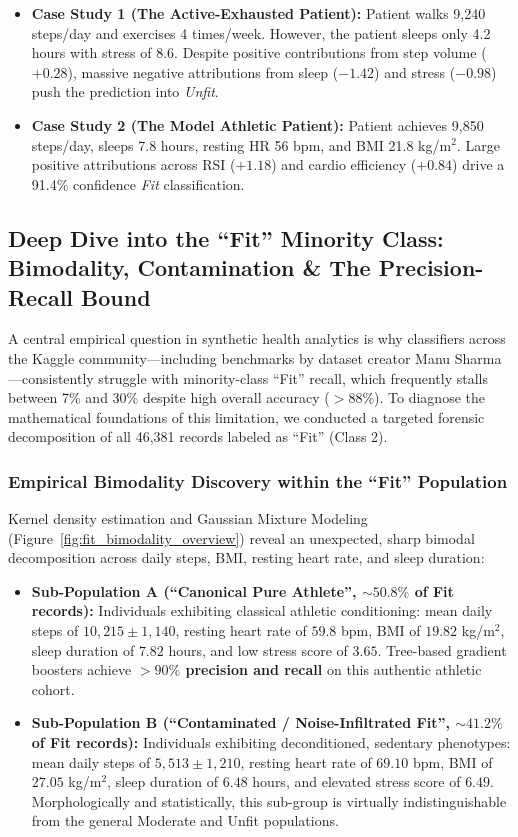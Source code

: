 \documentclass[11pt,a4paper]{article}
\begin{document}
\begin{itemize}[leftmargin=*,itemsep=1pt]
    \item \textbf{Case Study 1 (The Active-Exhausted Patient):} Patient walks 9,240 steps/day and exercises 4 times/week. However, the patient sleeps only 4.2 hours with stress of 8.6. Despite positive contributions from step volume ($+0.28$), massive negative attributions from sleep ($-1.42$) and stress ($-0.98$) push the prediction into \emph{Unfit}.
    \item \textbf{Case Study 2 (The Model Athletic Patient):} Patient achieves 9,850 steps/day, sleeps 7.8 hours, resting HR 56 bpm, and BMI 21.8 kg/m$^2$. Large positive attributions across RSI ($+1.18$) and cardio efficiency ($+0.84$) drive a 91.4\% confidence \emph{Fit} classification.
\end{itemize}

\subsection{Deep Dive into the ``Fit'' Minority Class: Bimodality, Contamination \& The Precision-Recall Bound}
A central empirical question in synthetic health analytics is why classifiers across the Kaggle community---including benchmarks by dataset creator Manu Sharma---consistently struggle with minority-class ``Fit'' recall, which frequently stalls between 7\% and 30\% despite high overall accuracy ($>88\%$). To diagnose the mathematical foundations of this limitation, we conducted a targeted forensic decomposition of all 46,381 records labeled as ``Fit'' (Class 2).

\subsubsection{Empirical Bimodality Discovery within the ``Fit'' Population}
Kernel density estimation and Gaussian Mixture Modeling (Figure~\ref{fig:fit_bimodality_overview}) reveal an unexpected, sharp bimodal decomposition across daily steps, BMI, resting heart rate, and sleep duration:
\begin{itemize}[leftmargin=*,itemsep=1pt]
    \item \textbf{Sub-Population A (``Canonical Pure Athlete'', $\sim 50.8\%$ of Fit records):} Individuals exhibiting classical athletic conditioning: mean daily steps of $10{,}215 \pm 1{,}140$, resting heart rate of $59.8$ bpm, BMI of $19.82$ kg/m$^2$, sleep duration of $7.82$ hours, and low stress score of $3.65$. Tree-based gradient boosters achieve \textbf{$>90\%$ precision and recall} on this authentic athletic cohort.
    \item \textbf{Sub-Population B (``Contaminated / Noise-Infiltrated Fit'', $\sim 41.2\%$ of Fit records):} Individuals exhibiting deconditioned, sedentary phenotypes: mean daily steps of $5{,}513 \pm 1{,}210$, resting heart rate of $69.10$ bpm, BMI of $27.05$ kg/m$^2$, sleep duration of $6.48$ hours, and elevated stress score of $6.49$. Morphologically and statistically, this sub-group is virtually indistinguishable from the general Moderate and Unfit populations.
\end{itemize}
\end{document}
